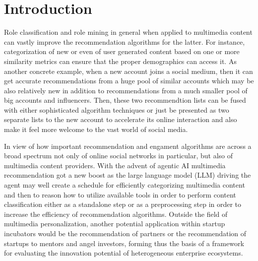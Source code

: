 \documentclass[conference, compsoc, final]{IEEEtran}
\begin{document}
\section{Introduction}\label{sec:introduction}


Role classification \cite{zhu:2023} and role mining \cite{ghai:2025} in general when applied to multimedia content can vastly improve the recommendation algorithms for the latter. For instance, categorization of new or even of user generated content based on one or more similarity metrics can ensure that the proper demographics can access it. As another concrete example, when a new account joins a social medium, then it can get accurate recommendations from a huge pool of similar accounts which may be also relatively new in addition to recommendations from a much smaller pool of big accounts and influencers. Then, these two recommendtion lists can be fused with either sophisticated algorithm techniques or just be presented as two separate lists to the new account to accelerate its online interaction and also make it feel more welcome to the vast world of social media.

In view of how important recommendation and engament algorithms are across a broad spectrum not only of online social networks in particular, but also of multimedia content providers. With the advent of agentic AI multimedia recommendation got a new boost as the large language model (LLM) driving the agent may well create a schedule for efficiently categorizing multimedia content and then to reason how to utilize available tools in order to perform content classification either as a standalone step or as a preprocessing step in order to increase the efficiency of recommendation algorithms. Outside the field of multimedia personalization, another potential application within startup incubators would be the recommendation of partners or the recommendation of startups to mentors and angel investors, forming thus the basis of a framework for evaluating the innovation potential of heterogeneous enterprise ecosystems.
\end{document}
